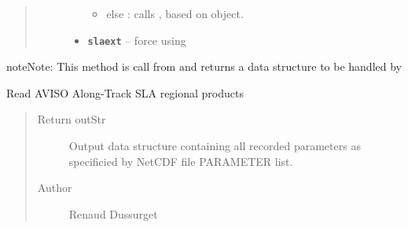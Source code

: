 \documentclass[letterpaper,10pt,english]{sphinxmanual}
\begin{document}
\begin{fulllineitems}
\begin{fulllineitems}
\begin{quote}
\begin{description}
\begin{itemize}
\begin{itemize}
\item {} 
else : calls {\hyperref[altimetry.data:altimetry.data.alti_data.read_nc]{\emph{}}}, based on {\hyperref[altimetry.tools.nctools:altimetry.tools.nctools.nc]{\emph{}}} object.

\end{itemize}


\item {} 
\textbf{\texttt{slaext}} -- force using {\hyperref[altimetry.data:altimetry.data.alti_data.read_slaext]{\emph{}}}

\end{itemize}

\end{description}\end{quote}

\begin{notice}{note}{Note:}
This method is call from {\hyperref[altimetry.data:altimetry.data.hydro_data.__init__]{\emph{}}} and returns a data structure to be handled by {\hyperref[altimetry.data:altimetry.data.hydro_data.update_dataset]{\emph{}}}
\end{notice}

\end{fulllineitems}


\begin{fulllineitems}
\label{altimetry.data:altimetry.data.alti_data.read_CTOH}
Read AVISO Along-Track SLA regional products
\begin{quote}\begin{description}
\item[{Return outStr}] \leavevmode
Output data structure containing all recorded parameters as specificied by NetCDF file PARAMETER list.

\item[{Author}] \leavevmode
Renaud Dussurget

\end{description}\end{quote}

\end{fulllineitems}


\end{fulllineitems}
\end{document}

